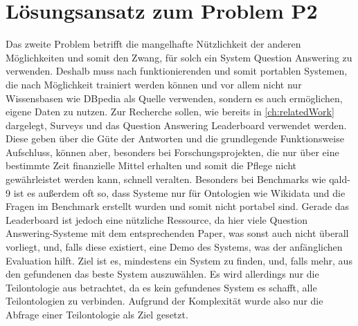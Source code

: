 \section{Lösungsansatz zum Problem P2}

Das zweite Problem betrifft die mangelhafte Nützlichkeit der anderen Möglichkeiten und somit den Zwang, für solch ein System Question Answering zu verwenden.
Deshalb muss nach funktionierenden und somit portablen Systemen, die nach Möglichkeit trainiert werden können und vor allem nicht nur Wissensbasen wie DBpedia als Quelle verwenden,
sondern es auch ermöglichen, eigene Daten zu nutzen.
Zur Recherche sollen, wie bereits in \cref{ch:relatedWork} dargelegt, Surveys und das Question Answering Leaderboard verwendet werden.
Diese geben über die Güte der Antworten und die grundlegende Funktionsweise Aufschluss, können aber, besonders bei Forschungsprojekten,
die nur über eine bestimmte Zeit finanzielle Mittel erhalten und somit die Pflege nicht gewährleistet werden kann, schnell veralten.
Besonders bei Benchmarks wie \ac{qald}-9 ist es außerdem oft so, dass Systeme nur für Ontologien wie Wikidata und die Fragen im Benchmark erstellt wurden und somit nicht portabel sind.
Gerade das Leaderboard ist jedoch eine nützliche Ressource, da hier viele Question Answering-Systeme mit dem entsprechenden Paper, was sonst auch nicht überall vorliegt, und, falls diese existiert,
eine Demo des Systems, was der anfänglichen Evaluation hilft.
Ziel ist es, mindestens ein System zu finden, und, falls mehr, aus den gefundenen das beste System auszuwählen.
Es wird allerdings nur die Teilontologie aus \citet{bb} betrachtet, da es kein gefundenes System es schafft, alle Teilontologien zu verbinden.
Aufgrund der Komplexität wurde also nur die Abfrage einer Teilontologie als Ziel gesetzt.
